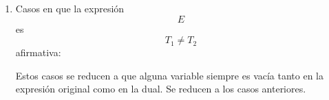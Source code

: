 \begin{enumerate}
\begin{enumerate}
\begin{enumerate}
\begin{enumerate}
\begin{enumerate}
          \emph{\textbf{a.5.HI.tts+tts*)}} La expresión sería una del
          tipo
          \[{T_{1} \cdot \mathit{TS}_{2}} = {T_{2} \cdot \mathit{TS}_{3}}\]
          ,
          \[{\left( {T_{1}{' + \mathit{TS}_{0}}} \right) + \mathit{TS}_{2}} = {\left( {T_{2}{' + \mathit{TS}_{1}}} \right) \cdot \mathit{TS}_{3}}\],
          dónde para \[T'\] suponemos (HI), que los valores de verdad de
          \[T_{1}{{' + \mathit{TS}_{2}} = T_{2}}{' + \mathit{TS}_{3}}\]
          son idénticos a los de
          \[\widetilde{T_{1}}{{' \cdot \widetilde{\mathit{TS}_{2}}} = \widetilde{T_{2}}}{' \cdot \widetilde{\mathit{TS}_{3}}}\]
          y viceversa. Ahora bien \[\mathit{TS}_{0} + \mathit{TS}_{2}\]
          podemos redu\-cirlo finalmente a un literal por evaluación,
          concretamente a una variable \[X\] o a una constante
          \[\Gamma\], e idénticamente para
          \[\mathit{TS}_{1} \cdot \mathit{TS}_{3}\].
          \[T_{2}{' \cdot \mathit{TS}_{3}}\]es lo mismo que una
          \[T_{3}\] cualquiera (de cualquier longitud). Así nos queda
          \[T_{1}{{' + L_{1}} = {T_{3} \cdot L_{2}}}\]que ya ha sido
          demostrado en \emph{a.5.tts+tts+)}. Así queda demostrado este
          caso.

          a.5.HI.t.neg) Cualquier T.p negado es susceptible de ser
          desarrollado (por las leyes de De Morgan) como un T.p y se
          aplica \emph{a.5.HI.*}.
        \item
          Casos en que la expresión \[E\]
          es\[T_{1} \neq T_{2}\]afirmativa:

          Estos casos se reducen a que alguna variable siempre es vacía
          tanto en la ex\-presión original como en la dual. Se reducen a
          los casos anteriores.
        \end{enumerate}
      \end{enumerate}
    \end{enumerate}
  \end{enumerate}
\end{enumerate}

